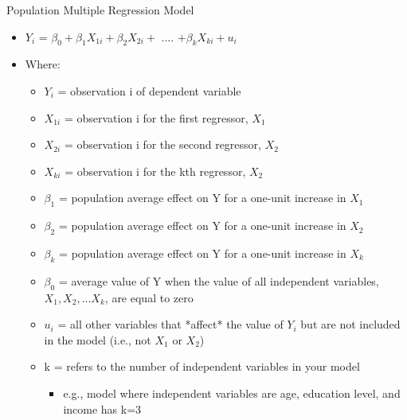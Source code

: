 \begin{frame}[shrink=10]{Population Multiple Regression Model}
	\begin{itemize}
	\item $Y_{i}$ = $\beta_{0} + \beta_{1}X_{1i} + \beta_{2}X_{2i} +$ .... $+\beta_{k}X_{ki} +  u_{i}$
	\item Where:
		\begin{itemize}
		\item $Y_{i}$ = observation i of dependent variable
		\item $X_{1i}$ = observation i for the first regressor, $X_{1}$
		\item $X_{2i}$ = observation i for the second regressor, $X_{2}$
		\item $X_{ki}$ = observation i for the kth regressor, $X_{2}$
		\item $\beta_{1}$ = population average effect on Y for a one-unit increase in $X_{1}$
		\item $\beta_{2}$ = population average effect on Y for a one-unit increase in $X_{2}$
		\item $\beta_{k}$ = population average effect on Y for a one-unit increase in $X_{k}$
		\item $\beta_{0}$ = average value of Y when the value of all independent variables, $X_{1}, X_{2},...X_{k}$, are equal to zero
		\item $u_{i}$ = all other variables that *affect* the value of $Y_{i}$ but are not included in the model (i.e., not $X_{1}$ or $X_{2}$)
		\item k = refers to the number of independent variables in your model
			\begin{itemize}
			\item e.g., model where independent variables are age, education level, and income has k=3
			\end{itemize}
		\end{itemize}
	\end{itemize}
\end{frame}

